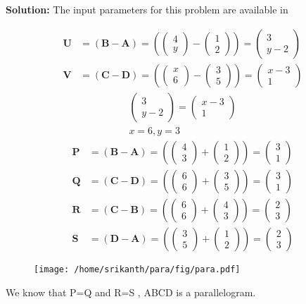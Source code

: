 \documentclass[12pt]{article}
\providecommand{\brak}[1]{\ensuremath{\left(#1\right)}}
\newcommand{\solution}{\noindent \textbf{Solution: }}
\newcommand{\myvec}[1]{\ensuremath{\begin{pmatrix}#1\end{pmatrix}}}
\let\vec\mathbf
\begin{document}
\solution The input parameters for this problem are available in
\begin{center}
\begin{table}[ht!]
	
\caption{}
\label{table}	
\end{table}
\end{center}
\begin{align}
  \label{eq:det2f}
  \vec{U} &=\brak{\vec{B}-\vec{A}} = \brak{\myvec{4 \\y } - \myvec{1 \\2 } } = \myvec{3 \\y-2 }\\
\vec{V} &= \brak{\vec{C}-\vec{D}} = \brak{\myvec{x \\6 } - \myvec{3 \\5 } } = \myvec{x-3 \\1}
\end{align}
\begin{align}
\myvec{3\\y-2}=\myvec{x-3\\1}\\
x=6 ,y=3
\end{align}
\begin{align}
\vec{P} &= \brak{\vec{B}-\vec{A}} = \brak{\myvec{4 \\3 } + \myvec{ 1 \\2} } = \myvec{3\\1}\\ 
\vec{Q} &= \brak{\vec{C}-\vec{D}} = \brak{\myvec{6 \\6 } + \myvec{ 3 \\5} } = \myvec{3\\1}\\
\vec{R} &= \brak{\vec{C}-\vec{B}} = \brak{\myvec{6 \\6 } + \myvec{ 4 \\ 3} } = \myvec{2\\3}\\
\vec{S} &= \brak{\vec{D}-\vec{A}} = \brak{\myvec{3 \\5 } + \myvec{1 \\2} } = \myvec{2\\3}
\end{align}
\begin{figure}[h!]
	\begin{center}
  \texttt{[image: /home/srikanth/para/fig/para.pdf]}
	\end{center}
\caption{}
\label{fig:Fig3}
\end{figure}
We know that P=Q and R=S , ABCD is a parallelogram. 
\end{document}
